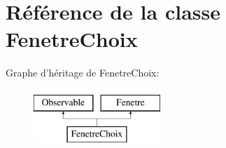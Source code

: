 \hypertarget{classFenetreChoix}{\section{\-Référence de la classe \-Fenetre\-Choix}
\label{classFenetreChoix}
}
\-Graphe d'héritage de \-Fenetre\-Choix\-:\begin{figure}[H]
\begin{center}
\leavevmode
\includegraphics[height=2.000000cm]{classFenetreChoix}
\end{center}
\end{figure}
